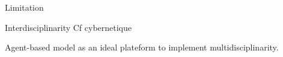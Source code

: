 \documentclass[12pt, notes=show]{beamer}
\begin{document}
\begin{frame}{Limitation}
\end{frame}

\begin{frame}{Interdisciplinarity}
	Cf cybernetique
\end{frame}


\begin{frame}
	Agent-based model as an ideal plateform to implement multidisciplinarity.
\end{frame}
\end{document}
